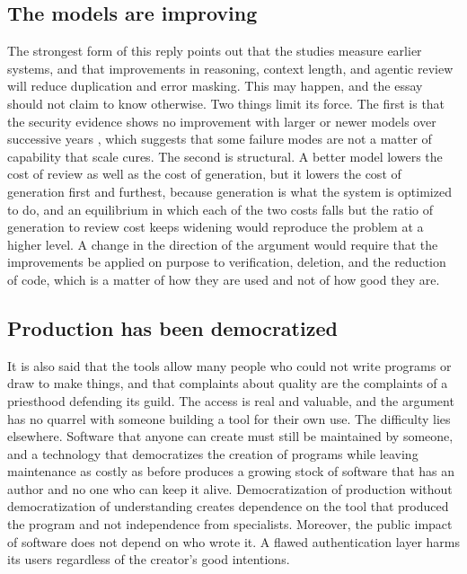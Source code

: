 \documentclass[11pt,a4paper]{article}
\theoremstyle{remark}
\begin{document}
\subsection{The models are improving}

The strongest form of this reply points out that the studies measure earlier systems, and that improvements in reasoning, context length, and agentic review will reduce duplication and error masking. This may happen, and the essay should not claim to know otherwise. Two things limit its force. The first is that the security evidence shows no improvement with larger or newer models over successive years \cite{TechRadar2025,Veracode2026}, which suggests that some failure modes are not a matter of capability that scale cures. The second is structural. A better model lowers the cost of review as well as the cost of generation, but it lowers the cost of generation first and furthest, because generation is what the system is optimized to do, and an equilibrium in which each of the two costs falls but the ratio of generation to review cost keeps widening would reproduce the problem at a higher level. A change in the direction of the argument would require that the improvements be applied on purpose to verification, deletion, and the reduction of code, which is a matter of how they are used and not of how good they are.

\subsection{Production has been democratized}

It is also said that the tools allow many people who could not write programs or draw to make things, and that complaints about quality are the complaints of a priesthood defending its guild. The access is real and valuable, and the argument has no quarrel with someone building a tool for their own use. The difficulty lies elsewhere. Software that anyone can create must still be maintained by someone, and a technology that democratizes the creation of programs while leaving maintenance as costly as before produces a growing stock of software that has an author and no one who can keep it alive. Democratization of production without democratization of understanding creates dependence on the tool that produced the program and not independence from specialists. Moreover, the public impact of software does not depend on who wrote it. A flawed authentication layer harms its users regardless of the creator's good intentions.
\end{document}
